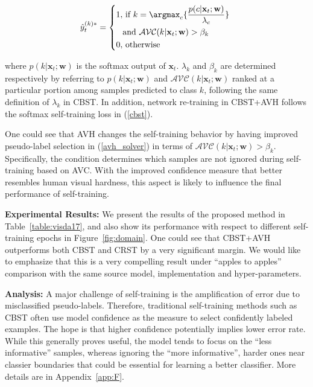 \begin{small}

\begin{equation}\label{avh_solver}
\hat{y}_{t}^{(k)*}=\left\{
\begin{aligned}
1, &~\text{if}~k=\argmax_{c}\{\frac {p(c|{\mathbf{x}_{t}};\mathbf{w})}{\lambda_c}\}~ \\
&\text{and}~ \mathcal{AVC}(k|\mathbf{x}_t;\mathbf{w})>\beta_k\\
0, &~\mathrm{otherwise}
\end{aligned}
\right.

\end{equation}
\end{small}

where $p(k|{\mathbf{x}_{t}};\mathbf{w})$ is the softmax output of $\mathbf{x}_{t}$. $\lambda_k$ and $\beta_k$ are determined respectively by referring to $p(k|\mathbf{x}_t;\mathbf{w})$ and $\mathcal{AVC}(k|\mathbf{x}_t;\mathbf{w})$ ranked at a particular portion among samples predicted to class $k$, following the same definition of $\lambda_k$ in CBST. In addition, network re-training in CBST+AVH follows the softmax self-training loss in (\ref{cbst}).

One could see that AVH changes the self-training behavior by having improved pseudo-label selection in (\ref{avh_solver}) in terms of $\mathcal{AVC}(k|\mathbf{x}_t;\mathbf{w})>\beta_{k}$.
Specifically, the condition determines which samples are not ignored during self-training based on AVC. With the improved confidence measure that better resembles human visual hardness, this aspect is likely to influence the final performance of self-training. 

\textbf{Experimental Results:} We present the results of the proposed method in Table~\ref{table:visda17}, and also show its performance with respect to different self-training epochs in Figure~\ref{fig:domain}. One could see that CBST+AVH outperforms both CBST and CRST by a very significant margin. We would like to emphasize that this is a very compelling result under ``apples to apples'' comparison with the same source model, implementation and hyper-parameters.

\textbf{Analysis:} A major challenge of self-training is the amplification of error due to misclassified pseudo-labels. Therefore, traditional self-training methods such as CBST often use model confidence as the measure to select confidently labeled examples. The hope is that higher confidence potentially implies lower error rate. While this generally proves useful, the model tends to focus on the ``less informative'' samples, whereas ignoring the ``more informative'', harder ones near classier boundaries that could be essential for learning a better classifier. More details are in Appendix~\ref{app:F}.

